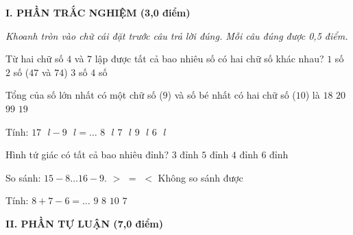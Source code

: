 
\setcounter{ex}{0}
\setcounter{bt}{0}

\textbf{\large I. PHẦN TRẮC NGHIỆM (3,0 điểm)}

{\itshape Khoanh tròn vào chữ cái đặt trước câu trả lời đúng. Mỗi câu đúng được 0,5 điểm.}

\begin{ex} %
Từ hai chữ số $4$ và $7$ lập được tất cả bao nhiêu số có hai chữ số khác nhau?
\choice
{$1$ số}
{\True $2$ số ($47$ và $74$)}
{$3$ số}
{$4$ số}
\end{ex}

\begin{ex} %
Tổng của số lớn nhất có một chữ số ($9$) và số bé nhất có hai chữ số ($10$) là
\choice
{$18$}
{$20$}
{$99$}
{\True $19$}
\end{ex}

\begin{ex} %
Tính: $17\text{ }l - 9\text{ }l = \dots$
\choice
{\True $8\text{ }l$}
{$7\text{ }l$}
{$9\text{ }l$}
{$6\text{ }l$}
\end{ex}

\begin{ex} %
Hình tứ giác có tất cả bao nhiêu đỉnh?
\choice
{$3$ đỉnh}
{$5$ đỉnh}
{\True $4$ đỉnh}
{$6$ đỉnh}
\end{ex}

\begin{ex} %
So sánh: $15 - 8 \dots 16 - 9$.
\choice
{$>$}
{\True $=$}
{$<$}
{Không so sánh được}
\end{ex}

\begin{ex} %
Tính: $8 + 7 - 6 = \dots$
\choice
{\True $9$}
{$8$}
{$10$}
{$7$}
\end{ex}

\vspace{4mm}
\textbf{\large II. PHẦN TỰ LUẬN (7,0 điểm)}

